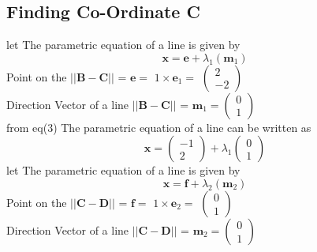 \documentclass[journal,10pt,twocolumn]{article}
\let\vec\mathbf
\newcommand{\myvec}[1]{\ensuremath{\begin{pmatrix}#1\end{pmatrix}}}
\begin{document}
\begin{flushleft}
\subsection{Finding Co-Ordinate C}
let The parametric equation of a line is given by
\begin{equation}
  \boldsymbol{x}= \vec{e}+\lambda_1(\vec{m}_1)   
\end{equation}
Point on the $||\vec{B-C}||$ = 
\begin{math}
\vec{e} =
\end{math}
\begin{math}
1 \times \vec{e}_1 =
\end{math}
\begin{math}
\myvec{2 \\ -2}
\end{math}
\vspace{0.3cm}\\
Direction Vector of a line  $||\vec{B-C}||$ = 
\begin{math}
\vec{m}_1 = \myvec{0 \\ 1}
\end{math}
\vspace{0.3cm}\\
from eq(3) The parametric equation of a line can be written as
\begin{equation}
     \boldsymbol{x} = \myvec{-1 \\ 2} + \lambda_1\myvec{0 \\ 1}
\end{equation}
let The parametric equation of a line is given by
\begin{equation}
 \boldsymbol{x} = \vec{f}+\lambda_2(\vec{m}_2)   
\end{equation}
Point on the $||\vec{C-D}||$ = 
\begin{math}
\vec{f} =
\end{math}
\begin{math}
1 \times \vec{e}_2 =
\end{math}
\begin{math}
\myvec{0 \\ 1}
\end{math}
\vspace{0.3cm}\\
Direction Vector of a line  $||\vec{C-D}||$ = 
\begin{math}
\vec{m}_2 = \myvec{0 \\ 1}
\end{math}
\vspace{0.3cm}\\

\end{flushleft}
\end{document}

